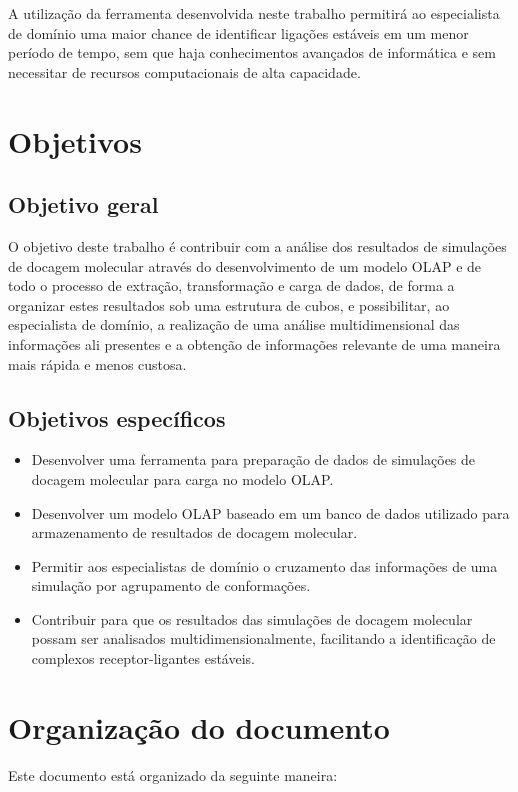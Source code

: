 A utilização da ferramenta desenvolvida neste trabalho permitirá ao especialista de domínio uma maior chance de identificar ligações estáveis em um menor período de tempo, sem que haja conhecimentos avançados de informática e sem necessitar de recursos computacionais de alta capacidade.

\section{Objetivos}
\subsection{Objetivo geral}
O objetivo deste trabalho é contribuir com a análise dos resultados de simulações de docagem molecular através do desenvolvimento de um modelo OLAP e de todo o processo de extração, transformação e carga de dados, de forma a organizar estes resultados sob uma estrutura de cubos, e possibilitar, ao especialista de domínio, a realização de uma análise multidimensional das informações ali presentes e a obtenção de informações relevante de uma maneira mais rápida e menos custosa.

\subsection{Objetivos específicos}
\begin{itemize}
	\item Desenvolver uma ferramenta para preparação de dados de simulações de docagem molecular para carga no modelo OLAP.
	\item Desenvolver um modelo OLAP baseado em um banco de dados utilizado para armazenamento de resultados de docagem molecular.
	\item Permitir aos especialistas de domínio o cruzamento das informações de uma simulação por agrupamento de conformações.
	\item Contribuir para que os resultados das simulações de docagem molecular possam ser analisados multidimensionalmente, facilitando a identificação de complexos receptor-ligantes estáveis.
\end{itemize}

\section{Organização do documento}

Este documento está organizado da seguinte maneira:

